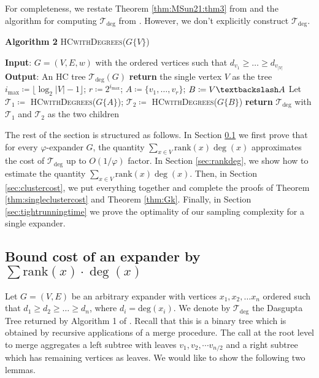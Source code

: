 \documentclass[letterpaper,11pt]{article}
\newcommand{\tdeg}{\mathcal{T}_{\deg}}
\newcommand{\rank}{\mathrm{rank}}
\theoremstyle{plain}
\theoremstyle{definition}
\theoremstyle{remark}
\begin{document}
For completeness, we restate Theorem \ref{thm:MSun21:thm3} from \cite{MSun21} and the algorithm for computing $\mathcal{T}_{\deg}$ from \cite{MSun21}. However, we don't explicitly construct $\mathcal{T}_{\deg}$.
\mstedg*
\begin{algorithm}[H]
	\caption*{\textbf{Algorithm 2} \textsc{HCwithDegrees($G\{V\}$)} \cite{MSun21}}
	\begin{algorithmic}[1]
		\STATE \textbf{Input}: $G=(V, E, w)$ with the ordered vertices such that $d_{v_1}\geq \ldots \geq d_{v_{|V|}}$  
		\STATE \textbf{Output}: An HC tree $\mathcal{T}_{\deg}(G)$
		\STATE \textbf{return} the single vertex $V$ as the tree
		\ELSE
		\STATE $i_{\max} \coloneqq \lfloor \log_2{|V|-1} \rfloor$; $r \coloneqq 2^{i_{\max}}$; $A \coloneqq \{v_1,\ldots,v_r\}$; $B \coloneqq V\textbackslash A$
		\STATE Let $\mathcal{T}_1 \coloneqq $ \textsc{HCwithDegrees($G\{A\}$)}; $\mathcal{T}_2 \coloneqq $ \textsc{HCwithDegrees($G\{B\}$)}
		\STATE \textbf{return} $\mathcal{T}_{\deg}$ with $\mathcal{T}_1$ and $\mathcal{T}_2$ as the two children
		\ENDIF
	\end{algorithmic}
\end{algorithm}

The rest of the section is structured as follows. In Section \ref{sec:exp-irr-opt} we first prove that for every $\varphi$-expander $G$, the quantity $\sum_{x \in V} \rank(x) \deg(x) $ approximates the cost of $\mathcal{T}_{\deg}$ up to $O(1/\varphi)$ factor. In Section \ref{sec:rankdeg}, we show how to estimate the quantity $\sum_{x \in V} \rank(x) \deg(x) $. Then, in Section \ref{sec:clustercost}, we put everything together and complete the proofs of Theorem \ref{thm:singleclustercost} and Theorem \ref{thm:Gk}. Finally, in Section \ref{sec:tightrunningtime} we prove the optimality of our sampling complexity for a single expander. 


\subsection{Bound cost of an expander by $\sum \rank(x)\cdot \deg(x)$}\label{sec:exp-irr-opt} 
Let $G = (V,E)$ be an arbitrary expander with vertices $x_1, x_2, \ldots x_n$ ordered such that $d_1 \geq d_2 \geq \ldots \geq d_n$, where $d_i = \text{deg}(x_i)$. We denote
by $\tdeg$ the Dasgupta Tree returned by Algorithm 1 of \cite{MSun21}. Recall that
this is a binary tree which is obtained by recursive applications of a merge procedure.
The call at the root level to merge aggregates a left subtree with leaves 
$v_1, v_2, \cdots v_{n/2}$ and a right subtree which has remaining vertices as leaves.
We would like to show the following two lemmas.
\end{document}
